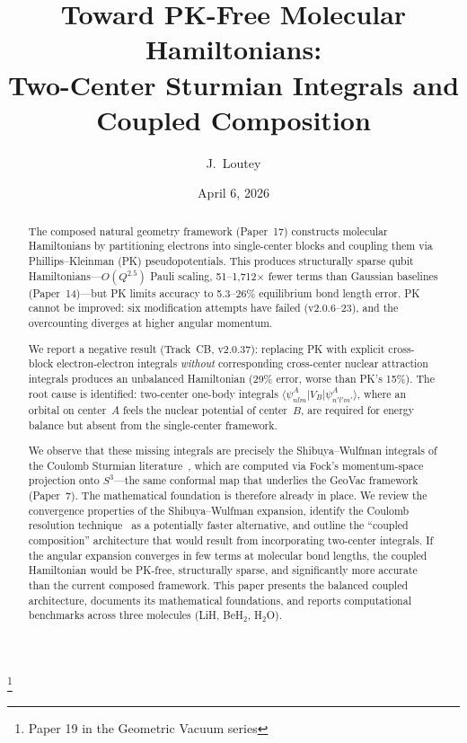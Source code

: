 \documentclass[aps,pra,twocolumn,superscriptaddress,longbibliography]{revtex4-2}
\begin{document}
\title{Toward PK-Free Molecular Hamiltonians:\\
Two-Center Sturmian Integrals and Coupled Composition}
\thanks{Paper 19 in the Geometric Vacuum series}

\author{J.~Loutey}

\date{April 6, 2026}


\begin{abstract}
The composed natural geometry framework (Paper~17) constructs
molecular Hamiltonians by partitioning electrons into single-center
blocks and coupling them via Phillips--Kleinman (PK) pseudopotentials.
This produces structurally sparse qubit Hamiltonians---$O(Q^{2.5})$
Pauli scaling, 51--1{,}712$\times$ fewer terms than Gaussian
baselines (Paper~14)---but PK limits accuracy to 5.3--26\%
equilibrium bond length error.  PK cannot be improved: six
modification attempts have failed (v2.0.6--23), and the overcounting
diverges at higher angular momentum.

We report a negative result (Track~CB, v2.0.37): replacing PK with
explicit cross-block electron-electron integrals \emph{without}
corresponding cross-center nuclear attraction integrals produces an
unbalanced Hamiltonian (29\% error, worse than PK's 15\%).  The root
cause is identified: two-center one-body integrals
$\langle \psi_{nlm}^A | V_B | \psi_{n'l'm'}^A \rangle$, where an
orbital on center~$A$ feels the nuclear potential of center~$B$, are
required for energy balance but absent from the single-center
framework.

We observe that these missing integrals are precisely the
Shibuya--Wulfman integrals of the Coulomb Sturmian
literature~\cite{shibuya1965,avery2004,avery2012}, which are computed
via Fock's momentum-space projection onto $S^3$---the same conformal
map that underlies the GeoVac framework (Paper~7).  The mathematical
foundation is therefore already in place.  We review the convergence
properties of the Shibuya--Wulfman expansion, identify the Coulomb
resolution technique~\cite{hoggan2011} as a potentially faster
alternative, and outline the ``coupled composition'' architecture
that would result from incorporating two-center integrals.  If the
angular expansion converges in few terms at molecular bond lengths,
the coupled Hamiltonian would be PK-free, structurally sparse, and
significantly more accurate than the current composed framework.
This paper presents the balanced coupled architecture, documents its mathematical foundations, and reports computational benchmarks across three molecules (LiH, BeH$_2$, H$_2$O).


\end{abstract}
\end{document}

